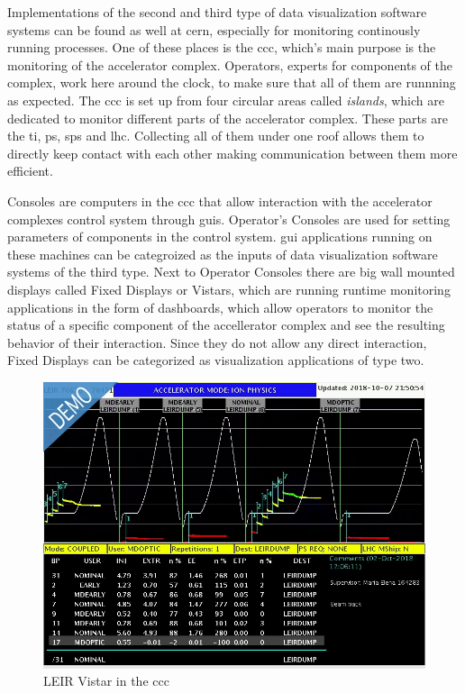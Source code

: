 Implementations of the second and third type of data visualization software systems can be found as well at \gls{cern}, especially for monitoring continously running processes. One of these places is the \gls{ccc}, which's main purpose is the monitoring of the accelerator complex. Operators, experts for components of the complex, work here around the clock, to make sure that all of them are runnning as expected. The \gls{ccc} is set up from four circular areas called \emph{islands}, which are dedicated to monitor different parts of the accelerator complex. These parts are the \gls{ti}, \gls{ps}, \gls{sps} and \gls{lhc}. Collecting all of them under one roof allows them to directly keep contact with each other making communication between them more efficient.
\cite{DayInCCC}

Consoles are computers in the \gls{ccc} that allow interaction with the accelerator complexes control system through \glspl{gui}. Operator's Consoles are used for setting parameters of components in the control system. \gls{gui} applications running on these machines can be categroized as the inputs of data visualization software systems of the third type.
Next to Operator Consoles there are big wall mounted displays called Fixed Displays or Vistars, which are running runtime monitoring applications in the form of dashboards, which allow operators to monitor the status of a specific component of the accellerator complex and see the resulting behavior of their interaction. Since they do not allow any direct interaction, Fixed Displays can be categorized as visualization applications of type two.
\cite{ControlSystemBible}

\begin{figure}[h]
    \centering
    \includegraphics[width=12cm]{resources/img/LEIRVistar}
    \caption{LEIR Vistar in the \gls{ccc}}
    \label{fig:leir}
\end{figure}

